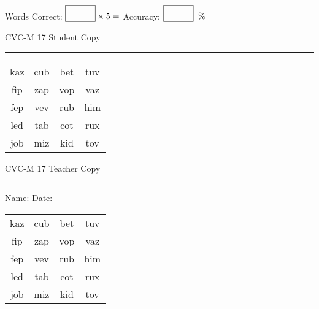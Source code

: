 \documentclass{memoir}
\begin{document}
\small

Words Correct: $\fbox{\phantom{\huge 100}} \times 5 = $ Accuracy: $\fbox{\phantom{\huge 100}}\;\; \%$ 

\vfill

\newpage


\footnotesize \noindent
CVC-M 17 \hfill Student Copy
\smallskip
\hrule

\Large

\setlength{\tabcolsep}{14pt}
\def\arraystretch{2}

{\selectfont


\begin{vplace}[0.5]
\begin{center}
\begin{tabular}{cccc}
kaz & cub & bet & tuv \\
fip & zap & vop & vaz \\
fep & vev & rub & him \\
led & tab & cot & rux \\
job & miz & kid & tov \\
\end{tabular}
\end{center}
\end{vplace}

}

\newpage

\footnotesize \noindent
CVC-M 17 \hfill Teacher Copy
\smallskip
\hrule

\small

\vfill

\noindent
Name: \underline{\hspace{1.75in}} \hfill Date: \underline{\hspace{1in}}

\Large

{\selectfont


\begin{vplace}[0.5]
\begin{center}
\begin{tabular}{cccc}
kaz & cub & bet & tuv \\
fip & zap & vop & vaz \\
fep & vev & rub & him \\
led & tab & cot & rux \\
job & miz & kid & tov \\
\end{tabular}
\end{center}
\end{vplace}



}
\end{document}
